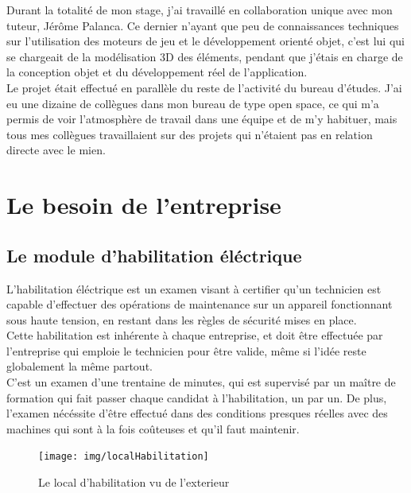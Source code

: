 \documentclass[a4paper]{article}
\begin{document}
    Durant la totalité de mon stage, j'ai travaillé en collaboration unique avec mon tuteur, Jérôme Palanca. Ce dernier n'ayant que peu de connaissances techniques sur l'utilisation des moteurs de jeu et le développement orienté objet, c'est lui qui se chargeait de la modélisation 3D des éléments, pendant que j'étais en charge de la conception objet et du développement réel de l'application. \\
    
    Le projet était effectué en parallèle du reste de l'activité du bureau d'études. J'ai eu une dizaine de collègues dans mon bureau de type open space, ce qui m'a permis de voir l'atmosphère de travail dans une équipe et de m'y habituer, mais tous mes collègues travaillaient sur des projets qui n'étaient pas en relation directe avec le mien. \\
    
    \section{Le besoin de l'entreprise}
    \subsection{Le module d'habilitation éléctrique}

        L'habilitation éléctrique est un examen visant à certifier qu'un technicien est capable d'effectuer des opérations de maintenance sur un appareil fonctionnant sous haute tension, en restant dans les règles de sécurité mises en place. \\

        Cette habilitation est inhérente à chaque entreprise, et doit être effectuée par l'entreprise qui emploie le technicien pour être valide, même si l'idée reste globalement la même partout. \\

        C'est un examen d'une trentaine de minutes, qui est supervisé par un maître de formation qui fait passer chaque candidat à l'habilitation, un par un. De plus, l'examen nécéssite d'être effectué dans des conditions presques réelles avec des machines qui sont à la fois coûteuses et qu'il faut maintenir. \\

        \begin{figure}[H]
            \centering
            \texttt{[image: img/localHabilitation]}
            \caption{Le local d'habilitation vu de l'exterieur}
        \end{figure}
\end{document}
